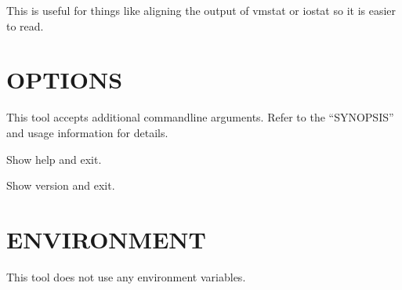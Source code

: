 \documentclass[letterpaper,10pt,english]{sphinxmanual}
\begin{document}
This is useful for things like aligning the output of vmstat or iostat so it
is easier to read.


\section{OPTIONS}
\label{\detokenize{mariadb-align-output:options}}
This tool accepts additional command\sphinxhyphen{}line arguments.  Refer to the
“SYNOPSIS” and usage information for details.

\begin{fulllineitems}
\label{\detokenize{mariadb-align-output:cmdoption-mariadb-align-output-help}}
Show help and exit.

\end{fulllineitems}


\begin{fulllineitems}
\label{\detokenize{mariadb-align-output:cmdoption-mariadb-align-output-version}}
Show version and exit.

\end{fulllineitems}



\section{ENVIRONMENT}
\label{\detokenize{mariadb-align-output:environment}}
This tool does not use any environment variables.
\end{document}
